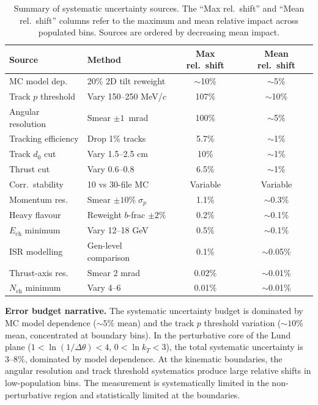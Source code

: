 \documentclass[11pt,a4paper]{article}
\begin{document}
\begin{table}[htbp]
\centering
\caption{Summary of systematic uncertainty sources.  The ``Max rel.\
  shift'' and ``Mean rel.\ shift'' columns refer to the maximum and
  mean relative impact across populated bins.  Sources are ordered
  by decreasing mean impact.}
\label{tbl:syst-summary}
\begin{tabular}{llcc}
\toprule
Source & Method & Max rel.\ shift & Mean rel.\ shift \\
\midrule
MC model dep. & 20\% 2D tilt reweight & $\sim$10\% & $\sim$5\% \\
Track $p$ threshold & Vary 150--250 MeV/$c$ & 107\% & $\sim$10\% \\
Angular resolution & Smear $\pm 1$~mrad & 100\% & $\sim$5\% \\
Tracking efficiency & Drop 1\% tracks & 5.7\% & $\sim$1\% \\
Track $d_0$ cut & Vary 1.5--2.5 cm & 10\% & $\sim$1\% \\
Thrust cut & Vary 0.6--0.8 & 6.5\% & $\sim$1\% \\
Corr.\ stability & 10 vs 30-file MC & Variable & Variable \\
Momentum res. & Smear $\pm 10\%\;\sigma_p$ & 1.1\% & $\sim$0.3\% \\
Heavy flavour & Reweight $b$-frac $\pm 2\%$ & 0.2\% & $\sim$0.1\% \\
$E_\text{ch}$ minimum & Vary 12--18 GeV & 0.5\% & $\sim$0.1\% \\
ISR modelling & Gen-level comparison & 0.1\% & $\sim$0.05\% \\
Thrust-axis res. & Smear 2 mrad & 0.02\% & $\sim$0.01\% \\
$N_\text{ch}$ minimum & Vary 4--6 & 0.01\% & $\sim$0.01\% \\
\bottomrule
\end{tabular}
\end{table}

\textbf{Error budget narrative.}  The systematic uncertainty budget
is dominated by MC model dependence ($\sim\!5\%$ mean) and the track
$p$ threshold variation ($\sim\!10\%$ mean, concentrated at boundary
bins).  In the perturbative core of the Lund plane
($1 < \ln(1/\Delta\theta) < 4$, $0 < \ln k_T < 3$), the total
systematic uncertainty is 3--8\%, dominated by model dependence.
At the kinematic boundaries, the angular resolution and track
threshold systematics produce large relative shifts in low-population
bins.  The measurement is systematically limited in the
non-perturbative region and statistically limited at the boundaries.
\end{document}
